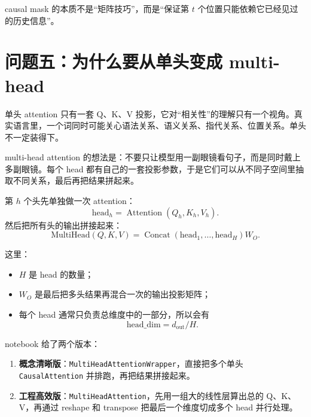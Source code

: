 \documentclass[11pt,a4paper]{ctexart}
\begin{document}
\begin{keypointblock}
causal mask 的本质不是“矩阵技巧”，而是“保证第 \(t\) 个位置只能依赖它已经见过的历史信息”。
\end{keypointblock}

\section{问题五：为什么要从单头变成 multi-head}

\begin{problemblock}
单头 attention 只有一套 Q、K、V 投影，它对“相关性”的理解只有一个视角。真实语言里，一个词同时可能关心语法关系、语义关系、指代关系、位置关系。单头不一定装得下。
\end{problemblock}

\begin{intuitionblock}
multi-head attention 的想法是：不要只让模型用一副眼镜看句子，而是同时戴上多副眼镜。每个 head 都有自己的一套投影参数，于是它们可以从不同子空间里抽取不同关系，最后再把结果拼起来。
\end{intuitionblock}

\begin{mathblock}
第 \(h\) 个头先单独做一次 attention：
\[
\text{head}_h = \operatorname{Attention}(Q_h, K_h, V_h).
\]
然后把所有头的输出拼接起来：
\[
\text{MultiHead}(Q,K,V)
=
\operatorname{Concat}(\text{head}_1,\ldots,\text{head}_H) W_O.
\]

这里：
\begin{itemize}
  \item \(H\) 是 head 的数量；
  \item \(W_O\) 是最后把多头结果再混合一次的输出投影矩阵；
  \item 每个 head 通常只负责总维度中的一部分，所以会有
  \[
  \text{head\_dim} = d_{\text{out}} / H .
  \]
\end{itemize}
\end{mathblock}

notebook 给了两个版本：

\begin{enumerate}
  \item \textbf{概念清晰版}：\texttt{MultiHeadAttentionWrapper}，直接把多个单头 \texttt{CausalAttention} 并排跑，再把结果拼接起来。
  \item \textbf{工程高效版}：\texttt{MultiHeadAttention}，先用一组大的线性层算出总的 Q、K、V，再通过 reshape 和 transpose 把最后一个维度切成多个 head 并行处理。
\end{enumerate}
\end{document}
